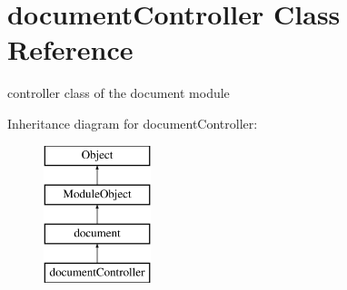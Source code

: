 \hypertarget{classdocumentController}{}\section{document\+Controller Class Reference}
\label{classdocumentController}


controller class of the document module  


Inheritance diagram for document\+Controller\+:\begin{figure}[H]
\begin{center}
\leavevmode
\includegraphics[height=4.000000cm]{classdocumentController}
\end{center}
\end{figure}
